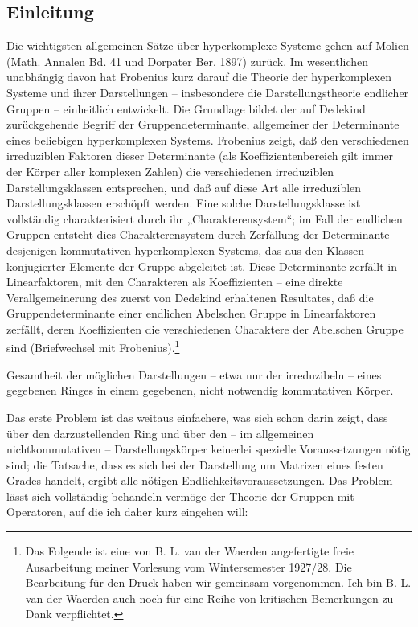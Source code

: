 \documentclass[11pt]{article}
\begin{document}
\subsection*{Einleitung}

Die wichtigsten allgemeinen Sätze über hyperkomplexe Systeme gehen auf Molien (Math. Annalen Bd. 41 und Dorpater Ber. 1897) zurück. Im wesentlichen unabhängig davon hat Frobenius kurz darauf die Theorie der hyperkomplexen Systeme und ihrer Darstellungen -- insbesondere die Darstellungstheorie endlicher Gruppen -- einheitlich entwickelt. Die Grundlage bildet der auf Dedekind zurückgehende Begriff der Gruppendeterminante, allgemeiner der Determinante eines beliebigen hyperkomplexen Systems. Frobenius zeigt, daß den verschiedenen irreduziblen Faktoren dieser Determinante (als Koeffizientenbereich gilt immer der Körper aller komplexen Zahlen) die verschiedenen irreduziblen Darstellungsklassen entsprechen, und daß auf diese Art alle irreduziblen Darstellungsklassen erschöpft werden. Eine solche Darstellungsklasse ist vollständig charakterisiert durch ihr „Charakterensystem“; im Fall der endlichen Gruppen entsteht dies Charakterensystem durch Zerfällung der Determinante desjenigen kommutativen hyperkomplexen Systems, das aus den Klassen konjugierter Elemente der Gruppe abgeleitet ist. Diese Determinante zerfällt in Linearfaktoren, mit den Charakteren als Koeffizienten -- eine direkte Verallgemeinerung des zuerst von Dedekind erhaltenen Resultates, daß die Gruppendeterminante einer endlichen Abelschen Gruppe in Linearfaktoren zerfällt, deren Koeffizienten die verschiedenen Charaktere der Abelschen Gruppe sind (Briefwechsel mit Frobenius).\footnote{Das Folgende ist eine von B. L. van der Waerden angefertigte freie Ausarbeitung meiner Vorlesung vom Wintersemester 1927/28. Die Bearbeitung für den Druck haben wir gemeinsam vorgenommen. Ich bin B. L. van der Waerden auch noch für eine Reihe von kritischen Bemerkungen zu Dank verpflichtet.}

Gesamtheit der möglichen Darstellungen -- etwa nur der irreduzibeln -- eines gegebenen Ringes in einem gegebenen, nicht notwendig kommutativen Körper.

Das erste Problem ist das weitaus einfachere, was sich schon darin zeigt, dass über den darzustellenden Ring und über den -- im allgemeinen nichtkommutativen -- Darstellungskörper keinerlei spezielle Voraussetzungen nötig sind; die Tatsache, dass es sich bei der Darstellung um Matrizen eines festen Grades handelt, ergibt alle nötigen Endlichkeitsvoraussetzungen. Das Problem lässt sich vollständig behandeln vermöge der Theorie der Gruppen mit Operatoren, auf die ich daher kurz eingehen will:
\end{document}
